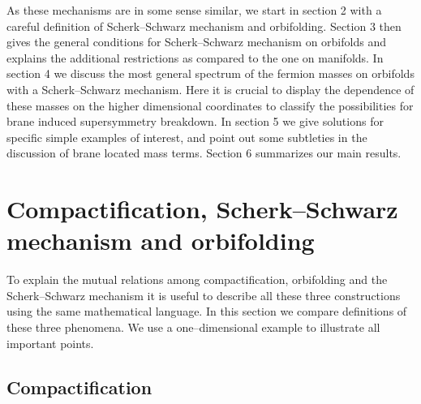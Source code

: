 \documentclass[a4paper,12pt]{article}
\begin{document}
As these mechanisms are in some sense similar, we start in section 2
with a careful definition of Scherk--Schwarz mechanism and
orbifolding. Section 3 then gives the general conditions for
Scherk--Schwarz mechanism on orbifolds and explains the additional
restrictions as compared to the one on manifolds. In section 4 we
discuss the most general spectrum of the fermion masses on orbifolds
with a Scherk--Schwarz mechanism. Here it is crucial to display the
dependence of these masses on the higher dimensional coordinates to
classify the possibilities for brane induced supersymmetry
breakdown. In section 5 we give solutions for specific simple examples
of interest, and point out some subtleties in the discussion of brane
located mass terms. Section 6 summarizes our main results.



\section{Compactification, Scherk--Schwarz mechanism and orbifolding}


To explain the mutual relations among compactification, orbifolding
and the Scherk--Schwarz mechanism it is useful to describe all these
three constructions using the same mathematical language. In this
section we compare definitions of these three phenomena. We use a
one--dimensional example to illustrate all important points.



\subsection{Compactification}
\end{document}
